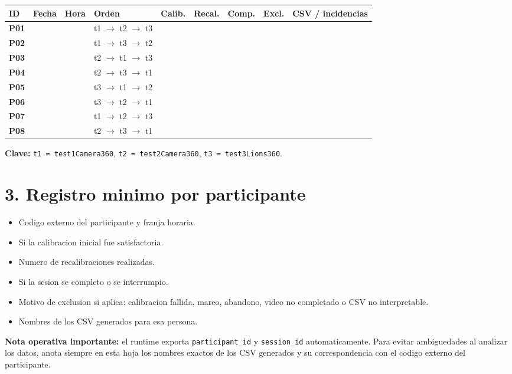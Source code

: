 \documentclass[10pt]{article}
\begin{document}
\begingroup
\setlength{\tabcolsep}{4pt}
\scriptsize
\begin{longtable}{|>{\bfseries}p{0.85cm}|p{1.55cm}|p{0.9cm}|p{3.25cm}|p{1.0cm}|p{0.95cm}|p{0.95cm}|p{1.15cm}|p{5.2cm}|}
\hline
ID & Fecha & Hora & Orden & Calib. & Recal. & Comp. & Excl. & CSV / incidencias \\
\hline
P01 & & & t1 $\rightarrow$ t2 $\rightarrow$ t3 & & & & & \\
\hline
P02 & & & t1 $\rightarrow$ t3 $\rightarrow$ t2 & & & & & \\
\hline
P03 & & & t2 $\rightarrow$ t1 $\rightarrow$ t3 & & & & & \\
\hline
P04 & & & t2 $\rightarrow$ t3 $\rightarrow$ t1 & & & & & \\
\hline
P05 & & & t3 $\rightarrow$ t1 $\rightarrow$ t2 & & & & & \\
\hline
P06 & & & t3 $\rightarrow$ t2 $\rightarrow$ t1 & & & & & \\
\hline
P07 & & & t1 $\rightarrow$ t2 $\rightarrow$ t3 & & & & & \\
\hline
P08 & & & t2 $\rightarrow$ t3 $\rightarrow$ t1 & & & & & \\
\hline
\end{longtable}
\endgroup

\textbf{Clave:} \texttt{t1 = test1Camera360}, \texttt{t2 = test2Camera360},
\texttt{t3 = test3Lions360}.

\section*{3. Registro minimo por participante}
\begin{itemize}
  \item Codigo externo del participante y franja horaria.
  \item Si la calibracion inicial fue satisfactoria.
  \item Numero de recalibraciones realizadas.
  \item Si la sesion se completo o se interrumpio.
  \item Motivo de exclusion si aplica: calibracion fallida, mareo, abandono, video no completado o CSV no interpretable.
  \item Nombres de los CSV generados para esa persona.
\end{itemize}

\textbf{Nota operativa importante:} el runtime exporta \texttt{participant\_id}
y \texttt{session\_id} automaticamente. Para evitar ambiguedades al analizar los
datos, anota siempre en esta hoja los nombres exactos de los CSV generados y su
correspondencia con el codigo externo del participante.
\end{document}
